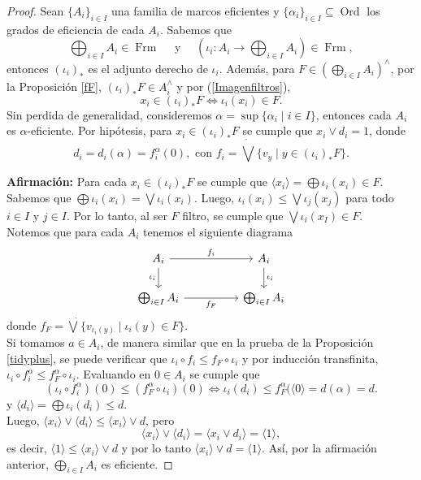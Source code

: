 \documentclass[12pt]{article}
\DeclareMathOperator{\Frm}{Frm}
\DeclareMathOperator{\Ord}{Ord}
\begin{document}
\begin{proof}
Sean $\{A_i\}_{i\in I}$ una familia de marcos eficientes y $\{\alpha_i\}_{i\in I}\subseteq \Ord$ los grados de eficiencia de cada $A_i$. Sabemos que 
\[
\bigoplus_{i\in I} A_i\in \Frm \quad \mbox{ y }\quad (\iota_i\colon A_i\to \bigoplus_{i\in I} A_i)\in \Frm,
\]
entonces $(\iota_i)_*$ es el adjunto derecho de $\iota_i$. Además, para $F\in (\bigoplus_{i\in I} A_i)^\wedge$, por la Proposición \ref{fF}, $(\iota_i)_*F\in A_i^\wedge$ y por (\ref{Imagenfiltros}), 
\[
x_i\in (\iota_i)_*F\Leftrightarrow \iota_i(x_i)\in F.
\]
Sin perdida de generalidad, consideremos $\alpha=\sup\{\alpha_i\mid i\in I\}$, entonces cada $A_i$ es $\alpha$-eficiente. Por hipótesis, para $x_i\in (\iota_i)_*F$ se cumple que $x_i\vee d_i=1$, donde
\[
d_i=d_i(\alpha)=f_i^\alpha(0), \mbox{ con } f_i=\dot{\bigvee}\{v_y\mid y\in (\iota_i)_*F\}.
\]

\noindent
\textbf{Afirmación:} Para cada $x_i\in (\iota_i)_*F$ se cumple que $\langle x_i\rangle=\bigoplus \iota_i(x_i)\in F$.\\

Sabemos que $\bigoplus \iota_i(x_i)=\bigvee \iota_i(x_i)$. Luego, $\iota_i(x_i)\leq \bigvee \iota_j(x_j)$ para todo $i\in I$ y $j\in I$. 
Por lo tanto, al ser $F$ filtro, se cumple que $\bigvee \iota_i(x_I)\in F$.\\

Notemos que para cada $A_i$ tenemos el siguiente diagrama
\[\begin{tikzcd}
    {A_i} && {A_i} \\
    {\bigoplus_{i\in I} A_i} && {\bigoplus_{i\in I} A_i}
    \arrow["{f_i}", from=1-1, to=1-3]
    \arrow["{\iota_i}"', from=1-1, to=2-1]
    \arrow["{\iota_i}", from=1-3, to=2-3]
    \arrow["f_F"', from=2-1, to=2-3]
\end{tikzcd}\]
donde $f_F=\dot{\bigvee}\{v_{\iota_i(y)}\mid \iota_i(y)\in F\}$.\\

Si tomamos $a\in A_i$, de manera similar que en la prueba de la Proposición \ref{tidyplus}, se puede verificar que $\iota_i\circ f_i\leq f_F\circ \iota_i$ y por inducción transfinita, $\iota_i\circ f_i^\alpha\leq f_F^\alpha\circ \iota_i$. Evaluando en $0\in A_i$ se cumple que
\[
(\iota_i\circ f_i^\alpha)(0)\leq (f_F^\alpha\circ \iota_i)(0)\Leftrightarrow \iota_i(d_i)\leq f_F^\alpha(\langle 0\rangle=d(\alpha)=d.
\]
y $\langle d_i\rangle =\bigoplus \iota_i(d_i)\leq d$.\\

Luego, $\langle x_i\rangle \vee \langle d_i\rangle\leq \langle x_i\rangle \vee d$, pero 
\[
\langle x_i\rangle \vee \langle d_i\rangle=\langle x_i\vee d_i\rangle = \langle 1\rangle,
\]
es decir, $\langle 1\rangle \leq \langle x_i\rangle \vee d$ y por lo tanto $\langle x_i\rangle \vee d= \langle 1\rangle$. Así, por la afirmación anterior, $ \bigoplus_{i\in I} A_i$ es eficiente.
\end{proof} 
\end{document}
